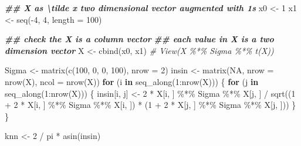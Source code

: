 \documentclass[
]{article}
\newenvironment{Shaded}{\begin{snugshade}}{\end{snugshade}}
\newcommand{\AttributeTok}[1]{\textcolor[rgb]{0.77,0.63,0.00}{#1}}
\newcommand{\CommentTok}[1]{\textcolor[rgb]{0.56,0.35,0.01}{\textit{#1}}}
\newcommand{\ConstantTok}[1]{\textcolor[rgb]{0.00,0.00,0.00}{#1}}
\newcommand{\ControlFlowTok}[1]{\textcolor[rgb]{0.13,0.29,0.53}{\textbf{#1}}}
\newcommand{\DecValTok}[1]{\textcolor[rgb]{0.00,0.00,0.81}{#1}}
\newcommand{\DocumentationTok}[1]{\textcolor[rgb]{0.56,0.35,0.01}{\textbf{\textit{#1}}}}
\newcommand{\FunctionTok}[1]{\textcolor[rgb]{0.00,0.00,0.00}{#1}}
\newcommand{\NormalTok}[1]{#1}
\newcommand{\OtherTok}[1]{\textcolor[rgb]{0.56,0.35,0.01}{#1}}
\newcommand{\SpecialCharTok}[1]{\textcolor[rgb]{0.00,0.00,0.00}{#1}}
\begin{document}
\begin{Shaded}
\begin{Highlighting}[]
\DocumentationTok{\#\# X as \textbackslash{}tilde x two dimensional vector augmented with 1s}
\NormalTok{x0 }\OtherTok{\textless{}{-}} \DecValTok{1} 
\NormalTok{x1 }\OtherTok{\textless{}{-}} \FunctionTok{seq}\NormalTok{(}\SpecialCharTok{{-}}\DecValTok{4}\NormalTok{, }\DecValTok{4}\NormalTok{, }\AttributeTok{length =} \DecValTok{100}\NormalTok{)}

\DocumentationTok{\#\# check the X is a column vector}
\DocumentationTok{\#\# each value in X is a two dimension vector}
\NormalTok{X }\OtherTok{\textless{}{-}} \FunctionTok{cbind}\NormalTok{(x0, x1)}
\CommentTok{\# View(X \%*\% Sigma \%*\% t(X))}

\NormalTok{Sigma }\OtherTok{\textless{}{-}} \FunctionTok{matrix}\NormalTok{(}\FunctionTok{c}\NormalTok{(}\DecValTok{100}\NormalTok{, }\DecValTok{0}\NormalTok{, }\DecValTok{0}\NormalTok{, }\DecValTok{100}\NormalTok{), }\AttributeTok{nrow =} \DecValTok{2}\NormalTok{)}
\NormalTok{insin }\OtherTok{\textless{}{-}} \FunctionTok{matrix}\NormalTok{(}\ConstantTok{NA}\NormalTok{, }\AttributeTok{nrow =} \FunctionTok{nrow}\NormalTok{(X), }\AttributeTok{ncol =} \FunctionTok{nrow}\NormalTok{(X))}
\ControlFlowTok{for}\NormalTok{ (i }\ControlFlowTok{in} \FunctionTok{seq\_along}\NormalTok{(}\DecValTok{1}\SpecialCharTok{:}\FunctionTok{nrow}\NormalTok{(X))) \{}
  \ControlFlowTok{for}\NormalTok{ (j }\ControlFlowTok{in} \FunctionTok{seq\_along}\NormalTok{(}\DecValTok{1}\SpecialCharTok{:}\FunctionTok{nrow}\NormalTok{(X))) \{}
\NormalTok{    insin[i, j] }\OtherTok{\textless{}{-}} \DecValTok{2} \SpecialCharTok{*}\NormalTok{ X[i, ] }\SpecialCharTok{\%*\%}\NormalTok{ Sigma }\SpecialCharTok{\%*\%}\NormalTok{ X[j, ] }\SpecialCharTok{/}
      \FunctionTok{sqrt}\NormalTok{((}\DecValTok{1} \SpecialCharTok{+} \DecValTok{2} \SpecialCharTok{*}\NormalTok{ X[i, ] }\SpecialCharTok{\%*\%}\NormalTok{ Sigma }\SpecialCharTok{\%*\%}\NormalTok{ X[i, ]) }\SpecialCharTok{*}\NormalTok{ (}\DecValTok{1} \SpecialCharTok{+} \DecValTok{2} \SpecialCharTok{*}\NormalTok{ X[j, ] }\SpecialCharTok{\%*\%}\NormalTok{ Sigma }\SpecialCharTok{\%*\%}\NormalTok{ X[j, ]))}
\NormalTok{  \}}
\NormalTok{\}}

\NormalTok{knn }\OtherTok{\textless{}{-}} \DecValTok{2} \SpecialCharTok{/}\NormalTok{ pi }\SpecialCharTok{*} \FunctionTok{asin}\NormalTok{(insin)}
\end{Highlighting}
\end{Shaded}
\end{document}
